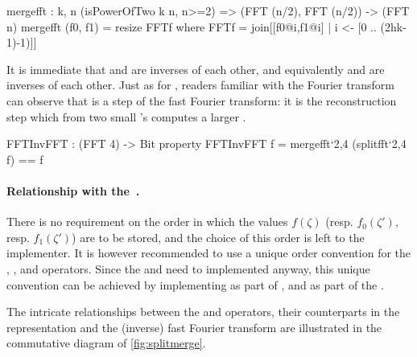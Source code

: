 \begin{code}
  mergefft : {k, n} (isPowerOfTwo k n, n>=2) =>
    (FFT (n/2), FFT (n/2)) -> (FFT n)
  mergefft (f0, f1) = resize FFTf where
    FFTf = join[[f0@i,f1@i] | i <- [0 .. (2^^(k-1)-1)]]
\end{code}

 It is immediate that \polsplit and \polmerge are inverses of each other, and equivalently \splitfft and \mergefft are inverses of each other. Just as for \splitfft, readers familiar with the Fourier transform can observe that \mergefft is a step of the fast Fourier transform: it is the reconstruction step which from two small \fft's computes a larger \fft.

\begin{code}
  FFTInvFFT : (FFT 4) -> Bit
  property FFTInvFFT f = mergefft`{2,4} (splitfft`{2,4} f) == f
\end{code}

 \paragraph{Relationship with the \fft.} There is no requirement on the order in which the values $f(\zeta)$ (resp. $f_0(\zeta')$, resp. $f_1(\zeta')$) are to be stored, and the choice of this order is left to the implementer. It is however recommended to use a unique order convention for the \fft, \ifft, \splitfft and \mergefft operators. Since the \fft and \ifft need to implemented anyway, this unique convention can be achieved \eg by implementing \splitfft as part of \ifft, and \mergefft as part of the \fft.
 
 
 The intricate relationships between the \polsplit and \polmerge operators, their counterparts in the \fft representation and the (inverse) fast Fourier transform are illustrated in the commutative diagram of \cref{fig:splitmerge}.
 
